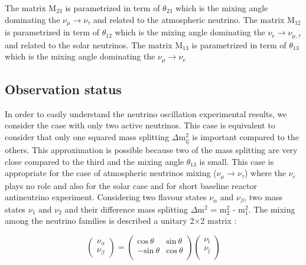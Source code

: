 \documentclass[main.tex]{subfiles}
\begin{document}
\NI The matrix M$_{\text{23}}$ is parametrized in term of $\theta_{\text{23}}$ which is the mixing angle dominating the $\nu_\mu \rightarrow \nu_\tau$ and related to the atmospheric neutrino. The matrix M$_{\text{12}}$ is parametrized in term of $\theta_{\text{12}}$ which is the mixing angle dominating the $\nu_\text{e} \rightarrow \nu_{\mu,\tau}$ and related to the solar neutrinos. The matrix M$_{\text{13}}$ is parametrized in term of $\theta_{\text{13}}$ which is the mixing angle dominating the $\nu_\mu \rightarrow \nu_\text{e}$


\FloatBarrier


\subsection{Observation status}\label{sec:ObservationStatusOscillation}


\NI In order to easily understand the neutrino oscillation experimental results, we consider the case with only two active neutrinos. This case is equivalent to consider that only one squared mass splitting $\Delta$m$_\text{ij}^\text{2}$ is important compared to the others. This approximation is possible because two of the mass splitting are very close compared to the third and the mixing angle $\theta_\text{13}$ is small. This case is appropriate for the case of atmospheric neutrinos mixing ($\nu_\mu \rightarrow \nu_\tau$) where the $\nu_e$ plays no role and also for the solar case and for short baseline reactor antineutrino experiment. Considering two flavour states $\nu_\alpha$ and $\nu_\beta$, two mass states $\nu_\text{1}$ and $\nu_\text{2}$ and their difference mass splitting $\Delta$m$^\text{2}$ = m$_\text{2}^\text{2}$ - m$_\text{1}^\text{2}$. The mixing among the neutrino families is described a unitary 2$\times$2 matrix : 


\begin{equation}
\left( \begin{array}{c}
\nu_\alpha \\
\nu_\beta
\end{array} \right) = \left(  \begin{array}{cc}
\text{cos}~\theta & \text{sin}~\theta \\
-\text{sin}~\theta & \text{cos}~\theta \\
\end{array}
\right) \left( \begin{array}{c}
\nu_\text{i} \\
\nu_\text{j} \\
\end{array} \right)
\end{equation}
\end{document}
